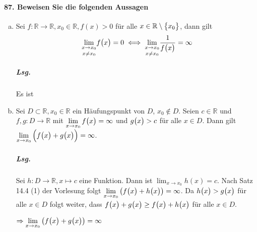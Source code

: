 \documentclass{scrreprt}
\begin{document}
\paragraph{87. Beweisen Sie die folgenden Aussagen}
\begin{enumerate}[(a)]
\item Sei $f \colon \mathbb{R} \to \mathbb{R}, x_0 \in \mathbb{R}, f(x) > 0$
  für alle $x \in \mathbb{R} \setminus \qty\big{x_0}$, dann gilt
  \[
    \underset{x \ne x_0}{\lim_{x \to x_0}} f\qty\big(x) = 0 \iff
    \underset{x \ne x_0}{\lim_{x \to x_0}} \frac{1}{f\qty\big(x)} = \infty
  \]
  \begin{small}
  \subparagraph{Lsg.} Es ist
\end{small}

\item Sei $D \subset \mathbb{R}, x_0 \in \mathbb{R}$ ein Häufungspunkt von $D$,
  $x_0 \notin D$.
  Seien $c \in \mathbb{R}$ und $f, g \colon D \to \mathbb{R}$ mit
  $\displaystyle \lim_{x \to x_0} f\qty\big(x) = \infty$ und $g\qty\big(x) > c$
  für alle $x \in D$.
  Dann gilt
  $\displaystyle \lim_{x \to x_0}\qty\Big(f\qty\big(x) + g\qty\big(x)) = \infty$.

  \subparagraph{Lsg.} Sei $h \colon D \to \mathbb{R}, x \mapsto c$ eine Funktion.
  Dann ist $\displaystyle \lim_{x \to x_0} h(x) = c$.
  Nach Satz 14.4 (1) der Vorlesung folgt
  $\displaystyle \lim_{x \to x_0}\qty\big(f\qty\big(x) + h\qty\big(x)) = \infty$.
  Da $h\qty\big(x) > g\qty\big(x)$ für alle $x \in D$ folgt weiter, dass
  $f\qty\big(x) + g\qty\big(x) \geq f\qty\big(x) + h\qty\big(x)$ für alle
  $x \in D$.

  $\Rightarrow \displaystyle \lim_{x \to x_0}\qty\big(f\qty\big(x) +
  g\qty\big(x)) = \infty$
\end{enumerate}
\end{document}
